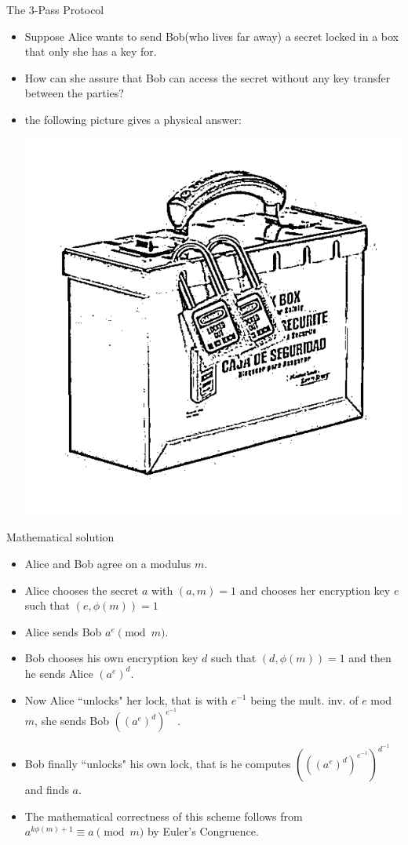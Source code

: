 \documentclass[ %
 usenames,dvipsnames,
aspectratio=169,11pt ]{beamer}
\newenvironment{stepitemize}{\begin{itemize}[<+->]}{\end{itemize} }
\begin{document}
\begin{frame}{The $3$-Pass Protocol}
    \begin{stepitemize}
    \item Suppose Alice wants to send Bob(who lives far away) a secret locked in a box that only she has a key for.
    \item How can she assure that Bob can access the secret without any key transfer between the parties?
    \item the following picture gives a physical answer:
   \begin{center}
    \includegraphics[scale=.18]{box.pdf}
    \end{center}
    \end{stepitemize}
\end{frame}

\begin{frame}{Mathematical solution}
\begin{stepitemize}
\item Alice and Bob agree on a modulus $m$.
\item Alice chooses the secret $a$ with $(a,m)=1$ and chooses her encryption key $e$ such that $(e, \phi(m))=1$
\item Alice sends Bob $a^e \pmod{m}$.
\item Bob chooses his own encryption key $d$ such that $(d, \phi(m))=1$ and then he sends Alice $(a^e)^d$.
\item Now Alice ``unlocks" her lock, that is with $e^{-1}$ being the mult. inv. of $e$ mod $m$, she sends Bob $((a^e)^d)^{e^{-1}}$.
\item Bob finally ``unlocks" his own lock, that is he computes
$(((a^e)^d)^{e^{-1}})^{d^{-1}}$ and finds $a$.
\item The mathematical correctness of this scheme follows from
$a^{k\phi(m)+1} \equiv a \pmod{m}$ by Euler's Congruence.
\end{stepitemize}
\end{frame}
\end{document}
